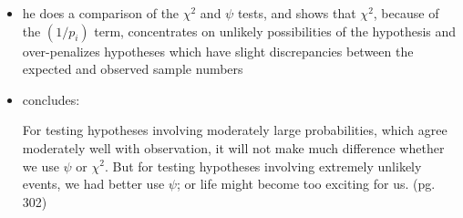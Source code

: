 \documentclass[../jaynes_prob_theory_notes.tex]{subfiles}
\begin{document}
\begin{itemize}
\begin{itemize}
                    \end{itemize}
                \item he does a comparison of the $\chi^2$ and $\psi$ tests, and shows that $\chi^2$, because of the $(1/p_i)$ term, concentrates on unlikely possibilities of the hypothesis and over-penalizes hypotheses which have slight discrepancies between the expected and observed sample numbers
                \item concludes:
                    \begin{displayquote}
                        For testing hypotheses involving moderately large probabilities, which agree moderately well with observation, it will not make much difference whether we use $\psi$ or $\chi^2$. But for testing hypotheses involving extremely unlikely events, we had better use $\psi$; or life might become too exciting for us. (pg. 302)
                    \end{displayquote}
            \end{itemize}
\end{document}
